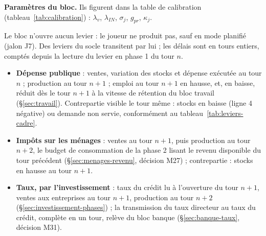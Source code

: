 \documentclass[11pt,a4paper]{article}
\begin{document}
\textbf{Paramètres du bloc.} Ils figurent dans la table de calibration (tableau~\ref{tab:calibration}) : $\lambda_v$, $\lambda_{\mathit{IN}}$, $\sigma_j$, $g_{\mathit{pr}}$, $\kappa_j$.

\begin{joueur}
Le bloc n'ouvre aucun levier : le joueur ne produit pas, sauf en mode planifié (jalon J7). Des leviers du socle transitent par lui ; les délais sont en tours entiers, comptés depuis la lecture du levier en phase 1 du tour $n$.
\begin{itemize}
\item \textbf{Dépense publique} : ventes, variation des stocks et dépense exécutée au tour $n$ ; production au tour $n + 1$ ; emploi au tour $n + 1$ en hausse, et, en baisse, réduit dès le tour $n + 1$ à la vitesse de rétention du bloc travail (\S\ref{sec:travail}). Contrepartie visible le tour même : stocks en baisse (ligne 4 négative) ou demande non servie, conformément au tableau~\ref{tab:leviers-cadre}.
\item \textbf{Impôts sur les ménages} : ventes au tour $n + 1$, puis production au tour $n + 2$, le budget de consommation de la phase 2 lisant le revenu disponible du tour précédent (\S\ref{sec:menages-revenu}, décision M27) ; contrepartie : stocks en hausse au tour $n + 1$.
\item \textbf{Taux, par l'investissement} : taux du crédit lu à l'ouverture du tour $n + 1$, ventes aux entreprises au tour $n + 1$, production au tour $n + 2$ (\S\ref{sec:investissement-phases}) ; la transmission du taux directeur au taux du crédit, complète en un tour, relève du bloc banque (\S\ref{sec:banque-taux}, décision M31).
\end{itemize}
\end{joueur}
\end{document}

